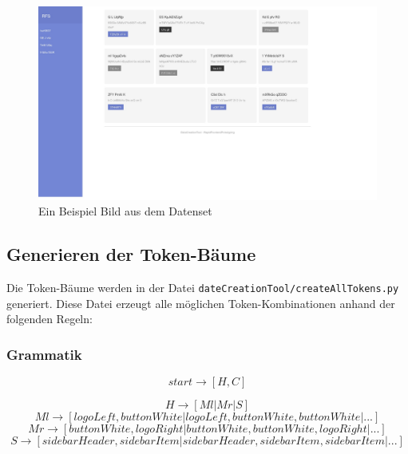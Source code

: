 \documentclass[pdftex,a4paper,halfparskip, article]{scrartcl}
\begin{document}
\begin{figure}[h]
\centering
\includegraphics[width=1\textwidth]{beispiel_daten}
\caption{Ein Beispiel Bild aus dem Datenset}
\label{fig:beispiel_daten}
\end{figure}

\subsection{Generieren der Token-Bäume}
Die Token-Bäume werden in der Datei \texttt{dateCreationTool/createAllTokens.py} generiert. Diese Datei erzeugt alle möglichen Token-Kombinationen anhand der folgenden Regeln:

\subsubsection{Grammatik}

\begin{equation}
start \rightarrow [H,C]
\end{equation}

\begin{equation}
H \rightarrow [Ml | Mr | S]
\end{equation}
\begin{equation}
Ml \rightarrow  [ logoLeft, buttonWhite | logoLeft, buttonWhite, buttonWhite | ...]
\end{equation}
\begin{equation}
Mr \rightarrow [buttonWhite, logoRight | buttonWhite, buttonWhite, logoRight | ...]
\end{equation}
\begin{equation}
S \rightarrow [sidebarHeader, sidebarItem| sidebarHeader, sidebarItem, sidebarItem | ...]
\end{equation}
\end{document}
